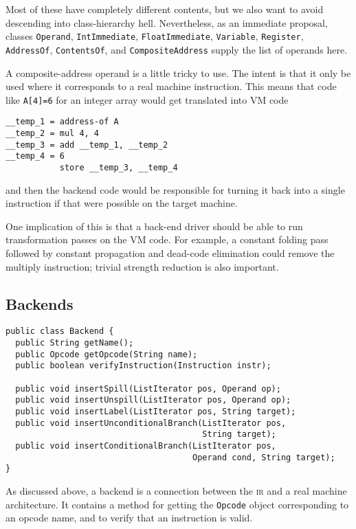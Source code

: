 \documentclass[11pt]{article}
\def\class#1{\texttt{#1}}
\def\ir{\textsc{ir}}
\begin{document}
Most of these have completely different contents, but we also want to
avoid descending into class-hierarchy hell.  Nevertheless, as an
immediate proposal, classes \class{Operand}, \class{Int\-Immediate},
\class{Float\-Immediate}, \class{Variable}, \class{Register},
\class{Address\-Of}, \class{Contents\-Of}, and
\class{Composite\-Address} supply the list of operands here.

A composite-address operand is a little tricky to use.  The intent is
that it only be used where it corresponds to a real machine
instruction.  This means that code like \verb|A[4]=6| for an integer
array would get translated into VM code

\begin{verbatim}
__temp_1 = address-of A
__temp_2 = mul 4, 4
__temp_3 = add __temp_1, __temp_2
__temp_4 = 6
           store __temp_3, __temp_4
\end{verbatim}

\noindent and then the backend code would be responsible for turning it back
into a single instruction if that were possible on the target machine.

One implication of this is that a back-end driver should be able to
run transformation passes on the VM code.  For example, a constant
folding pass followed by constant propagation and dead-code
elimination could remove the multiply instruction; trivial strength
reduction is also important.

\subsection{Backends}

\begin{verbatim}
public class Backend {
  public String getName();
  public Opcode getOpcode(String name);
  public boolean verifyInstruction(Instruction instr);

  public void insertSpill(ListIterator pos, Operand op);
  public void insertUnspill(ListIterator pos, Operand op);
  public void insertLabel(ListIterator pos, String target);
  public void insertUnconditionalBranch(ListIterator pos,
                                        String target);
  public void insertConditionalBranch(ListIterator pos,
                                      Operand cond, String target);
}
\end{verbatim}

As discussed above, a backend is a connection between the \ir{} and a
real machine architecture.  It contains a method for getting the
\texttt{Opcode} object corresponding to an opcode name, and to verify
that an instruction is valid.
\end{document}

